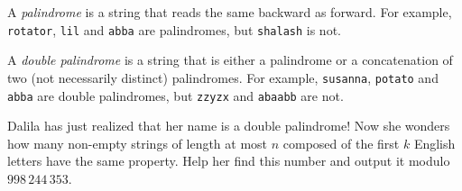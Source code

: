 A \textit{palindrome} is a string that reads the same backward as forward. For example, \texttt{rotator}, \texttt{lil} and \texttt{abba} are palindromes, but \texttt{shalash} is not.

A \textit{double palindrome} is a string that is either a palindrome or a concatenation of two (not necessarily distinct) palindromes. For example, \texttt{susanna}, \texttt{potato} and \texttt{abba} are double palindromes, but \texttt{zzyzx} and \texttt{abaabb} are not.

Dalila has just realized that her name is a double palindrome! Now she wonders how many non-empty strings of length at most $n$ composed of the first $k$ English letters have the same property. Help her find this number and output it modulo $998\,244\,353$.
